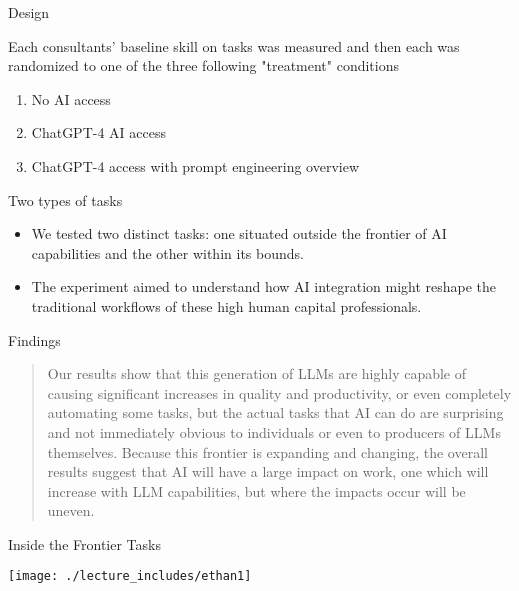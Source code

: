 \documentclass{beamer}
\begin{document}
\begin{frame}{Design}

Each consultants' baseline skill on tasks was measured and then each was randomized to one of the three following "treatment" conditions

	\begin{enumerate}
	\item No AI access
	\item ChatGPT-4 AI access
	\item ChatGPT-4 access with prompt engineering overview
	\end{enumerate}

\end{frame}

\begin{frame}{Two types of tasks}

\begin{itemize}

\item We tested two distinct tasks: one situated outside the frontier of AI capabilities and the other within its bounds. 
\item The experiment aimed to understand how AI integration might reshape the traditional workflows of these high human capital professionals.

\end{itemize}

\end{frame}


\begin{frame}{Findings}

\begin{quote}

Our results show that this generation of LLMs are highly capable of causing significant increases in quality and productivity, or even completely automating some tasks, but the actual tasks that AI can do are surprising and not immediately obvious to individuals or even to producers of LLMs themselves. Because this frontier is expanding and changing, the overall results suggest that AI will have a large impact on work, one which will increase with LLM capabilities, but where the impacts occur will be uneven.
\end{quote}

\end{frame}


\begin{frame}{Inside the Frontier Tasks}
\begin{center}
\texttt{[image: ./lecture\_includes/ethan1]}
\end{center}
\end{frame}
\end{document}
